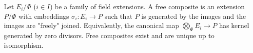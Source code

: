Let $E_i/\Phi$ ($i \in I$) be a family of field extensions. A free composite is an extension $P/\Phi$ with embeddings $\sigma_i: E_i \to P$ such that $P$ is generated by the images and the images are "freely" joined. Equivalently, the canonical map $\bigotimes_\Phi E_i \to P$ has kernel generated by zero divisors. Free composites exist and are unique up to isomorphism.
